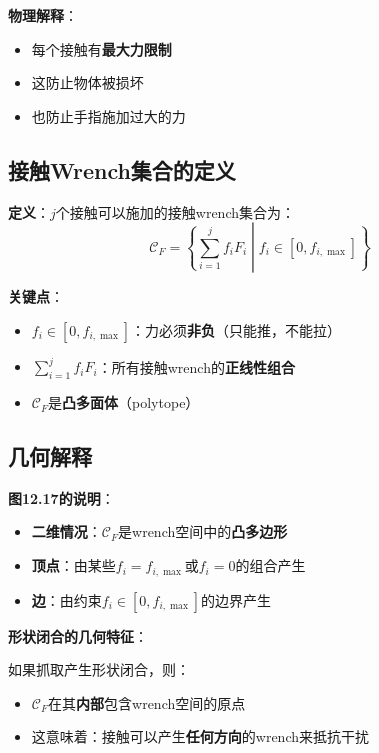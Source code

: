 \documentclass[12pt,a4paper]{article}
\begin{document}
\textbf{物理解释}：
\begin{itemize}
\item 每个接触有\textbf{最大力限制}
\item 这防止物体被损坏
\item 也防止手指施加过大的力
\end{itemize}

\subsection{接触Wrench集合的定义}

\textbf{定义}：$j$个接触可以施加的接触wrench集合为：
\begin{equation}
\mathcal{C}_F = \left\{\sum_{i=1}^j f_i F_i \middle| f_i \in [0, f_{i,\max}] \right\}
\label{eq:12.15}
\end{equation}

\textbf{关键点}：
\begin{itemize}
\item $f_i \in [0, f_{i,\max}]$：力必须\textbf{非负}（只能推，不能拉）
\item $\sum_{i=1}^j f_i F_i$：所有接触wrench的\textbf{正线性组合}
\item $\mathcal{C}_F$是\textbf{凸多面体}（polytope）
\end{itemize}

\subsection{几何解释}

\textbf{图12.17的说明}：

\begin{itemize}
\item \textbf{二维情况}：$\mathcal{C}_F$是wrench空间中的\textbf{凸多边形}
\item \textbf{顶点}：由某些$f_i = f_{i,\max}$或$f_i = 0$的组合产生
\item \textbf{边}：由约束$f_i \in [0, f_{i,\max}]$的边界产生
\end{itemize}

\textbf{形状闭合的几何特征}：

如果抓取产生形状闭合，则：
\begin{itemize}
\item $\mathcal{C}_F$在其\textbf{内部}包含wrench空间的原点
\item 这意味着：接触可以产生\textbf{任何方向}的wrench来抵抗干扰
\end{itemize}
\end{document}
